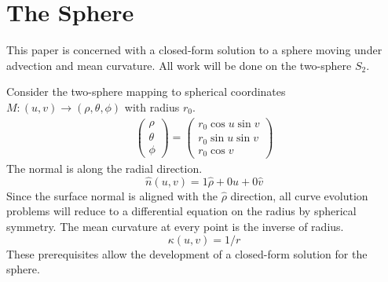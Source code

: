 \documentclass[journal]{IEEEtran}
\begin{document}
\section{The Sphere}
This paper is concerned with a closed-form solution to a sphere moving under advection and mean curvature.
All work will be done on the two-sphere $S_2$.

Consider the two-sphere mapping to spherical coordinates $M \colon (u,v) \rightarrow (\rho, \theta, \phi)$ with radius $r_0$.
\begin{align}
  \label{eqn:sphere:mapping}
  \begin{pmatrix}
    \rho \\
    \theta \\
    \phi
  \end{pmatrix} = 
  \begin{pmatrix}
    r_0 \cos u \sin v \\
    r_0 \sin u \sin v \\
    r_0 \cos v
  \end{pmatrix}
\end{align}
The normal is along the radial direction.
\begin{equation}
  \label{eqn:sphere:normal}
  \hat{n}(u,v) = 1\hat{\rho} + 0 \hat{u} + 0 \hat{v}
\end{equation}
Since the surface normal is aligned with the $\hat{\rho}$ direction, all curve evolution problems will reduce to a differential equation on the radius by spherical symmetry.
The mean curvature at every point is the inverse of radius.
\begin{equation}
  \label{eqn:sphere:curvature}
  \kappa(u,v) = 1/r
\end{equation}
These prerequisites allow the development of a closed-form solution for the sphere.
\end{document}
